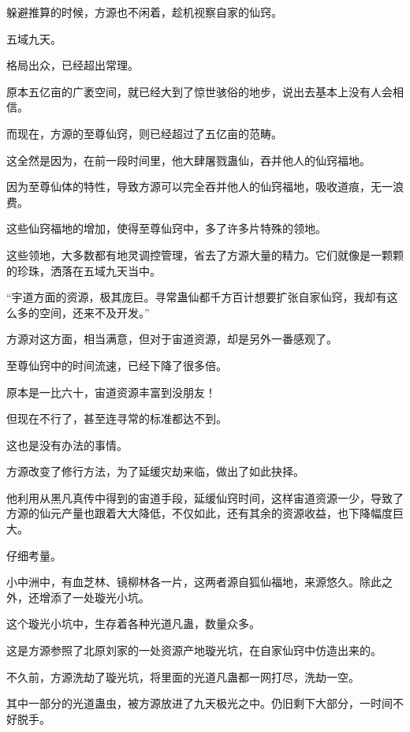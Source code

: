 
\begin{this_body}

躲避推算的时候，方源也不闲着，趁机视察自家的仙窍。

五域九天。

格局出众，已经超出常理。

原本五亿亩的广袤空间，就已经大到了惊世骇俗的地步，说出去基本上没有人会相信。

而现在，方源的至尊仙窍，则已经超过了五亿亩的范畴。

这全然是因为，在前一段时间里，他大肆屠戮蛊仙，吞并他人的仙窍福地。

因为至尊仙体的特性，导致方源可以完全吞并他人的仙窍福地，吸收道痕，无一浪费。

这些仙窍福地的增加，使得至尊仙窍中，多了许多片特殊的领地。

这些领地，大多数都有地灵调控管理，省去了方源大量的精力。它们就像是一颗颗的珍珠，洒落在五域九天当中。

“宇道方面的资源，极其庞巨。寻常蛊仙都千方百计想要扩张自家仙窍，我却有这么多的空间，还来不及开发。”

方源对这方面，相当满意，但对于宙道资源，却是另外一番感观了。

至尊仙窍中的时间流速，已经下降了很多倍。

原本是一比六十，宙道资源丰富到没朋友！

但现在不行了，甚至连寻常的标准都达不到。

这也是没有办法的事情。

方源改变了修行方法，为了延缓灾劫来临，做出了如此抉择。

他利用从黑凡真传中得到的宙道手段，延缓仙窍时间，这样宙道资源一少，导致了方源的仙元产量也跟着大大降低，不仅如此，还有其余的资源收益，也下降幅度巨大。

仔细考量。

小中洲中，有血芝林、镜柳林各一片，这两者源自狐仙福地，来源悠久。除此之外，还增添了一处璇光小坑。

这个璇光小坑中，生存着各种光道凡蛊，数量众多。

这是方源参照了北原刘家的一处资源产地璇光坑，在自家仙窍中仿造出来的。

不久前，方源洗劫了璇光坑，将里面的光道凡蛊都一网打尽，洗劫一空。

其中一部分的光道蛊虫，被方源放进了九天极光之中。仍旧剩下大部分，一时间不好脱手。


\end{this_body}
